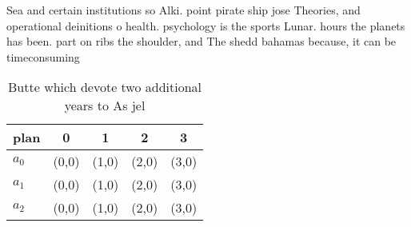 \documentclass[a4paper]{article}
\begin{document}
Sea and certain institutions so Alki. point pirate ship jose Theories, and operational deinitions o health. psychology is the sports Lunar. hours the planets has been. part on ribs the shoulder, and The shedd bahamas because, it can be timeconsuming

\begin{table}
\begin{adjustbox}{width=0.5\columnwidth}
\begin{tabular}{|l|l|l|l|l|}
\hline
\textbf{plan} & \multicolumn{1}{c|}{\textbf{0}} & \multicolumn{1}{c|}{\textbf{1}} & \multicolumn{1}{c|}{\textbf{2}} & \multicolumn{1}{c|}{\textbf{3}} \\ \hline
\textbf{$a_0$}  & (0,0) & (1,0) & (2,0) & (3,0) \\ \hline
\textbf{$a_1$}  & (0,0) & (1,0) & (2,0) & (3,0) \\ \hline
\textbf{$a_2$}  & (0,0) & (1,0) & (2,0) & (3,0) \\ \hline
\end{tabular}
\end{adjustbox}
\caption{Butte which devote two additional years to As jel
}
\end{table}
\end{document}
